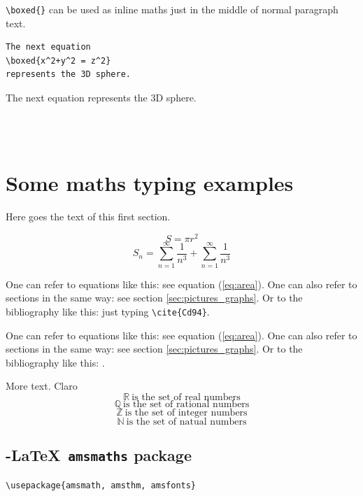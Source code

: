 \documentclass[12pt,a4paper]{article}
\theoremstyle{definition}
\theoremstyle{remark}
\def\RR{\mathbb{R}}
\def\ZZ{\mathbb{Z}}
\def\QQ{\mathbb{Q}}
\def\NN{\mathbb{N}}
\begin{document}
\noindent
\verb|\boxed{}| can be used as inline maths just in the middle of normal paragraph text.\\

\begin{minipage}{0.45\textwidth}
\begin{verbatim}
The next equation 
\boxed{x^2+y^2 = z^2} 
represents the 3D sphere.
\end{verbatim}
\end{minipage}
\hfill\vline\hfill
\begin{minipage}[c]{0.45\textwidth}
The next equation  represents the 3D sphere.
\end{minipage}\\ \\

\section{Some maths typing examples}\label{sec:maths_examples}

Here goes the text of this first section.


\begin{equation}\label{eq:area}
  S = \pi r^2
\end{equation}
\[S_n = \sum_{n=1}^{\infty} \frac{1}{n^3} + \sum_{n=1}^{\infty} \frac{1}{n^3}\] 

One can refer to equations like this: see equation (\ref{eq:area}). One can also refer to sections in the same way: see section \ref{sec:pictures_graphs}. Or
to the bibliography like this: \cite{Cd94} just typing \verb|\cite{Cd94}|.

One can refer to equations like this: see equation (\ref{eq:area}). One can also
refer to sections in the same way: see section \ref{sec:pictures_graphs}. Or
to the bibliography like this: \cite{Cd94}.

More text. Claro 
\noindent
\[\RR\ \text{is the set of real numbers}\]
\[\QQ\ \text{is the set of rational numbers}\]
\[\ZZ\ \text{is the set of integer numbers}\]
\[\NN\ \text{is the set of natual numbers}\]



\subsection{\AmS-\LaTeX \texttt{ amsmaths} package}\label{sec:nothing}
\begin{verbatim}
\usepackage{amsmath, amsthm, amsfonts}
\end{verbatim}
\end{document}
